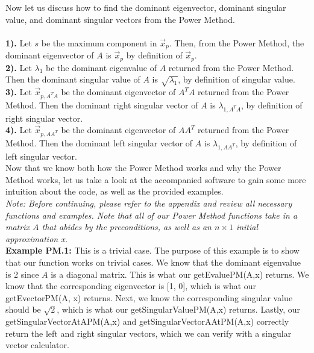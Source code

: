 \documentclass{article}
\begin{document}
\noindent Now let us discuss how to find the dominant eigenvector, dominant singular value, and dominant singular vectors from the Power Method. \\\\

\noindent\textbf{1). }Let $s$ be the maximum component in $\vec{x}^{\,}_{p}$. Then, from the Power Method, the dominant eigenvector of $A$ is $\vec{x}^{\,}_{p}$ by definition of $\vec{x}^{\,}_{p}$.\\

\noindent\textbf{2). } Let $\lambda_1$ be the dominant eigenvalue of $A$ returned from the Power Method. Then the dominant singular value of $A$ is $\sqrt{\lambda_1}$, by definition of singular value. \\

\noindent\textbf{3). } Let $\vec{x}_{p, A^TA}$ be the dominant eigenvector of $A^TA$ returned from the Power Method. Then the dominant right singular vector of $A$ is $\lambda_{1, A^TA}$, by definition of right singular vector. \\

\noindent\textbf{4). } Let $\vec{x}_{p, AA^T}$ be the dominant eigenvector of $AA^T$ returned from the Power Method. Then the dominant left singular vector of $A$ is $\lambda_{1, AA^T}$, by definition of left singular vector. \\

\noindent Now that we know both how the Power Method works and why the Power Method works, let us take a look at the accompanied software to gain some more intuition about the code, as well as the provided examples. \\

\noindent \textit{Note: Before continuing, please refer to the appendix and review all necessary functions and examples. Note that all of our Power Method functions take in a matrix $A$ that abides by the preconditions, as well as an $n \times 1$ initial approximation x.}\\

\noindent \textbf{Example PM.1: }This is a trivial case. The purpose of this example is to show that our function works on trivial cases. We know that the dominant eigenvalue is 2 since $A$ is a diagonal matrix. This is what our getEvaluePM(A,x) returns. We know that the corresponding eigenvector is [1, 0], which is what our getEvectorPM(A, x) returns. Next, we know the corresponding singular value should be $\sqrt2$, which is what our getSingularValuePM(A,x) returns. Lastly, our getSingularVectorAtAPM(A,x) and getSingularVectorAAtPM(A,x) correctly return the left
and right singular vectors, which we can verify with a singular vector calculator.\\
\end{document}
